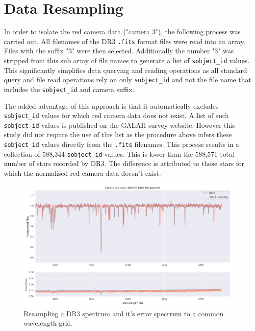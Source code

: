 \section{Data Resampling}

In order to isolate the red camera data ("camera 3"), the following process was carried out. All filenames of the DR3 \texttt{.fits} format files were read into an array. Files with the suffix "3" were then selected. Additionally the number "3" was stripped from this sub array of file names to generate a list of \texttt{sobject\_id} values. This significantly simplifies data querying and reading operations as all standard query and file read operations rely on only \texttt{sobject\_id} and not the file name that includes the \texttt{sobject\_id} and camera suffix. 

The added advantage of this approach is that it automatically excludes \texttt{sobject\_id} values for which red camera data does not exist. A list of such \texttt{sobject\_id} values is published on the GALAH survey website. However this study did not require the use of this list as the procedure above infers these \texttt{sobject\_id} values directly from the \texttt{.fits} filenames. This process results in a collection of 588,344 \texttt{sobject\_id} values. This is lower than the 588,571 total number of stars recorded by DR3. The difference is attributed to those stars for which the normalised red camera data doesn't exist. 

\begin{figure}[h]
\centering
\includegraphics[scale=.40]{figures/resampling example.png}
\caption{Resampling a DR3 spectrum and it's error spectrum to a common wavelength grid.}
\end{figure}

